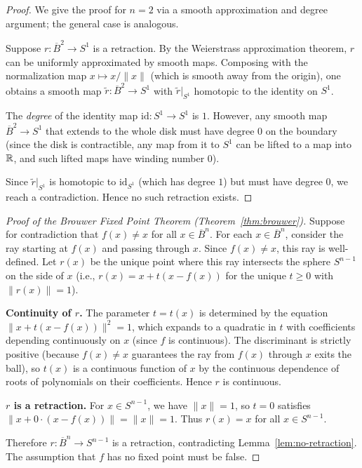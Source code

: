 \documentclass[11pt,a4paper]{article}
\begin{document}
\begin{proof}
We give the proof for $n = 2$ via a smooth approximation and degree
argument; the general case is analogous.

Suppose $r \colon \overline{B}^2 \to S^1$ is a retraction.  By the
Weierstrass approximation theorem, $r$ can be uniformly approximated
by smooth maps.  Composing with the normalization map
$x \mapsto x / \|x\|$ (which is smooth away from the origin), one
obtains a smooth map $\tilde{r} \colon \overline{B}^2 \to S^1$ with
$\tilde{r}|_{S^1}$ homotopic to the identity on $S^1$.

The \emph{degree} of the identity map $\mathrm{id} \colon S^1 \to S^1$
is $1$.  However, any smooth map $\overline{B}^2 \to S^1$ that
extends to the whole disk must have degree $0$ on the boundary
(since the disk is contractible, any map from it to $S^1$ can be
lifted to a map into $\mathbb{R}$, and such lifted maps have winding number
$0$).

Since $\tilde{r}|_{S^1}$ is homotopic to $\mathrm{id}_{S^1}$ (which
has degree $1$) but must have degree $0$, we reach a contradiction.
Hence no such retraction exists.
\end{proof}

\begin{proof}[Proof of the Brouwer Fixed Point Theorem
  (Theorem~\ref{thm:brouwer})]
Suppose for contradiction that $f(x) \neq x$ for all
$x \in \overline{B}^n$.  For each $x \in \overline{B}^n$, consider
the ray starting at $f(x)$ and passing through $x$.  Since
$f(x) \neq x$, this ray is well-defined.  Let $r(x)$ be the unique
point where this ray intersects the sphere $S^{n-1}$ on the side of
$x$ (i.e., $r(x) = x + t(x - f(x))$ for the unique $t \geq 0$ with
$\|r(x)\| = 1$).

\textbf{Continuity of $r$.}
The parameter $t = t(x)$ is determined by the equation
$\|x + t(x - f(x))\|^2 = 1$, which expands to a quadratic in $t$
with coefficients depending continuously on $x$ (since $f$ is
continuous).  The discriminant is strictly positive (because $f(x)
\neq x$ guarantees the ray from $f(x)$ through $x$ exits the ball),
so $t(x)$ is a continuous function of $x$ by the continuous
dependence of roots of polynomials on their coefficients.  Hence $r$
is continuous.

\textbf{$r$ is a retraction.}
For $x \in S^{n-1}$, we have $\|x\| = 1$, so $t = 0$ satisfies
$\|x + 0 \cdot (x - f(x))\| = \|x\| = 1$.  Thus $r(x) = x$ for all
$x \in S^{n-1}$.

Therefore $r \colon \overline{B}^n \to S^{n-1}$ is a retraction,
contradicting Lemma~\ref{lem:no-retraction}.  The assumption that $f$
has no fixed point must be false.
\end{proof}
\end{document}

